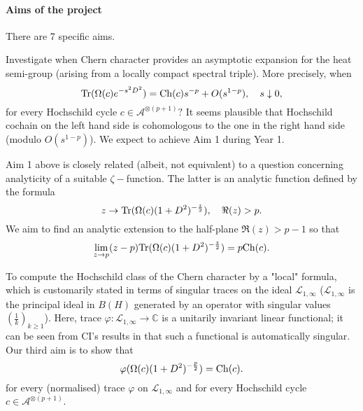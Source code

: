 \documentclass[12pt]{article}
\begin{document}



\paragraph*{Aims of the project} There are 7 specific aims.


 Investigate when Chern character provides an asymptotic expansion for the heat semi-group (arising from a locally compact spectral triple). More precisely, when 
\begin{equation}\label{heat eq}
{\rm Tr}(\Omega(c)e^{-s^2D^2})={\rm Ch}(c)s^{-p}+O(s^{1-p}),\quad s\downarrow0,
\end{equation}
for every Hochschild cycle $c\in\mathcal{A}^{\otimes (p+1)}?$ It seems plausible that Hochschild cochain on the left hand side is cohomologous to the one in the right hand side (modulo $O(s^{1-p})$). We expect to achieve Aim 1 during Year 1.

 Aim 1 above is closely related (albeit, not equivalent) to a question concerning analyticity of a suitable $\zeta-$function. The latter is an analytic function defined by the formula
$$z\to {\rm Tr}(\Omega(c)(1+D^2)^{-\frac{z}{2}}),\quad \Re(z)>p.$$
We aim to find an analytic extension to the half-plane $\Re(z)>p-1$ so that
$$\lim_{z\to p}(z-p){\rm Tr}(\Omega(c)(1+D^2)^{-\frac{z}{2}})=p{\rm Ch}(c).$$

 To compute the Hochschild class of the Chern character by a "local" formula, which is customarily  stated in terms of singular traces on the ideal $\mathcal{L}_{1,\infty}$ ($\mathcal{L}_{1,\infty}$ is the principal ideal in $B(H)$ generated by an operator with singular values $(\frac1k)_{k\geq1}$). Here, trace $\varphi:\mathcal{L}_{1,\infty}\to\mathbb{C}$ is a unitarily invariant linear functional; it can be seen from CI's results in \cite{book} that such a functional is automatically singular. Our third aim is to show that
\begin{equation}\label{super main eq}
\varphi(\Omega(c)(1+D^2)^{-\frac{p}{2}})={\rm Ch}(c).
\end{equation}
for every (normalised) trace $\varphi$ on $\mathcal{L}_{1,\infty}$ and for every Hochschild cycle $c\in\mathcal{A}^{\otimes (p+1)}.$ 
\end{document}
